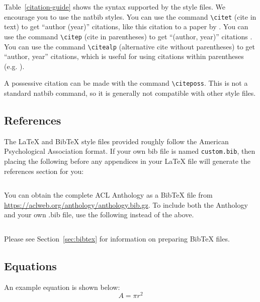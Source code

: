\documentclass[11pt]{article}
\begin{document}
Table~\ref{citation-guide} shows the syntax supported by the style files.
We encourage you to use the natbib styles.
You can use the command \verb|\citet| (cite in text) to get ``author (year)'' citations, like this citation to a paper by \citet{Gusfield:97}.
You can use the command \verb|\citep| (cite in parentheses) to get ``(author, year)'' citations \citep{Gusfield:97}.
You can use the command \verb|\citealp| (alternative cite without parentheses) to get ``author, year'' citations, which is useful for using citations within parentheses (e.g. \citealp{Gusfield:97}).

A possessive citation can be made with the command \verb|\citeposs|.
This is not a standard natbib command, so it is generally not compatible
with other style files.

\subsection{References}

\nocite{Ando2005,andrew2007scalable,rasooli-tetrault-2015}

The \LaTeX{} and Bib\TeX{} style files provided roughly follow the American Psychological Association format.
If your own bib file is named \texttt{custom.bib}, then placing the following before any appendices in your \LaTeX{} file will generate the references section for you:
\begin{quote}
\begin{verbatim}

\end{verbatim}
\end{quote}

You can obtain the complete ACL Anthology as a Bib\TeX{} file from \url{https://aclweb.org/anthology/anthology.bib.gz}.
To include both the Anthology and your own .bib file, use the following instead of the above.
\begin{quote}
\begin{verbatim}

\end{verbatim}
\end{quote}

Please see Section~\ref{sec:bibtex} for information on preparing Bib\TeX{} files.

\subsection{Equations}

An example equation is shown below:
\begin{equation}
  \label{eq:example}
  A = \pi r^2
\end{equation}
\end{document}
